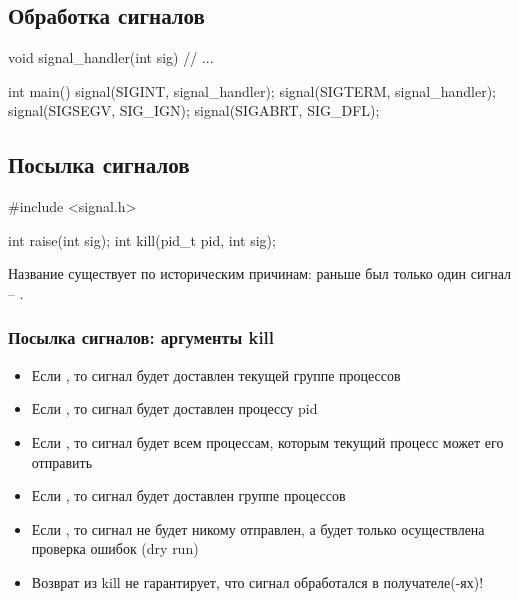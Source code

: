   \subsection{Обработка сигналов}
    \begin{cminted}
void signal_handler(int sig) {
  // ...
}

int main() {
  signal(SIGINT, signal_handler);
  signal(SIGTERM, signal_handler);
  signal(SIGSEGV, SIG_IGN);
  signal(SIGABRT, SIG_DFL);
}      
    \end{cminted}
    
  \subsection{Посылка сигналов}
    \begin{cminted}
#include <signal.h>

int raise(int sig);
int kill(pid_t pid, int sig);
    \end{cminted}
Название  существует по историческим причинам: раньше был только один сигнал -- .
  
  \subsubsection{Посылка сигналов: аргументы kill}
    \begin{itemize}
      \item Если , то сигнал будет доставлен текущей группе процессов
      \item Если , то сигнал будет доставлен процессу pid
      \item Если , то сигнал будет всем процессам, которым текущий процесс может его отправить
      \item Если , то сигнал будет доставлен группе процессов 
      \item Если , то сигнал не будет никому отправлен, а будет только осуществлена проверка ошибок (dry run)
      \item Возврат из kill не гарантирует, что сигнал обработался в получателе(-ях)!
    \end{itemize}
  
